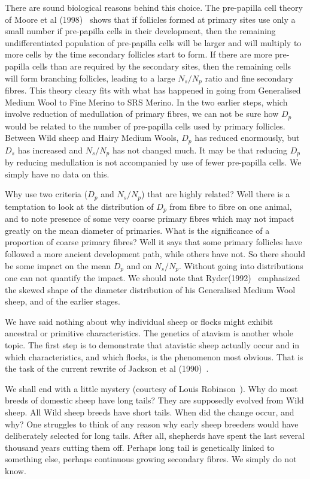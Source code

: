 \documentclass[titlepage]{article}  %
\begin{document}
There are sound biological reasons behind this choice. The pre-papilla cell theory of Moore et al (1998)~\cite{moor:98} shows that if follicles formed at primary sites use only a small number if pre-papilla cells in their development, then the remaining undifferentiated population of pre-papilla cells will be larger and will multiply to more cells by the time secondary follicles start to form. If there are more pre-papilla cells than are required by the secondary sites, then the remaining cells will form branching follicles, leading to a large $N_{s}/N_{p}$ ratio and fine secondary fibres.  This theory cleary fits with what has happened in going from Generalised Medium Wool to Fine Merino to SRS Merino. In the two earlier steps, which involve reduction of medullation of primary fibres, we can not be sure how $D_{p}$ would be related to the number of pre-papilla cells used by primary follicles. Between Wild sheep and Hairy Medium Wools, $D_{p}$ has reduced enormously, but $D_{s}$ has increased and $N_{s}/N_{p}$ has not changed much. It may be that reducing $D_{p}$ by reducing medullation is not accompanied by use of fewer pre-papilla cells. We simply have no data on this.

Why use two criteria ($D_{p}$ and $N_{s}/N_{p}$) that are highly related?  Well there is a temptation to look at the distribution of $D_{p}$ from fibre to fibre on one animal, and to note presence of some very coarse primary fibres which may not impact greatly on the mean diameter of primaries. What is the significance of a proportion of coarse primary fibres? Well it says that some primary follicles have followed a more ancient development path, while others have not. So there should be some impact on the mean $D_{p}$ and on $N_{s}/N_{p}$. Without going into distributions one can not quantify the impact. We should note that Ryder(1992)~\cite{ryde:92} emphasized the skewed shape of the diameter distribution of his Generalised Medium Wool sheep, and of the earlier stages. 

We have said nothing about why individual sheep or flocks might exhibit  ancestral or primitive characteristics. The genetics of atavism is another whole topic. The first step is to demonstrate that atavistic sheep actually occur and in which characteristics, and which flocks, is the phenomenon most obvious.  That is the task of the current rewrite of Jackson et al (1990)~\cite{jack:90}.

We shall end with a little mystery (courtesy of Louis Robinson~\cite{robi:na}). Why do most breeds of domestic sheep have long tails? They are supposedly evolved from Wild sheep. All Wild sheep breeds have short tails. When did the change occur, and why? One struggles to think of any reason why early sheep breeders would have deliberately selected for long tails.  After all, shepherds have spent the last several thousand years cutting them off. Perhaps long tail is genetically linked to something else, perhaps continuous growing secondary fibres. We simply do not know.
\end{document}
